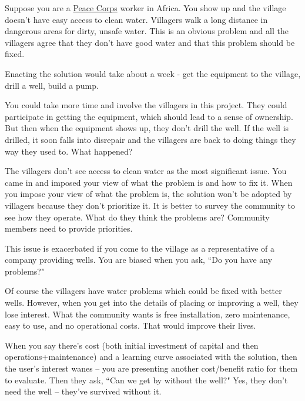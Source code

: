\begin{mdframed}[frametitle={Building a Well in a Village},frametitlerule=true,frametitlealignment=\centering]
Suppose you are a \href{http://www.peacecorps.gov/}{Peace Corps} worker in Africa. 
You show up and the village doesn't have easy access to clean water. Villagers walk a long distance in dangerous areas for dirty, unsafe water. This is an obvious problem and all the villagers agree that they don't have good water and that this problem should be fixed.

Enacting the solution would take about a week - get the equipment to the village, drill a well, build a pump.

You could take more time and involve the villagers in this project. They could participate in getting the equipment, which should lead to a sense of ownership.
But then when the equipment shows up, they don't drill the well. If the well is drilled, it soon falls into disrepair and the villagers are back to doing things they way they used to. What happened?

The villagers don't see access to clean water as the most significant issue. You came in and imposed your view of what the problem is and how to fix it. When you impose your view of what the problem is, the solution won't be adopted by villagers because they don't prioritize it.
It is better to survey the community to see how they operate. What do they think the problems are?
Community members need to provide priorities.

This issue is exacerbated if you come to the village as a representative of a company providing wells. You are biased when you ask, ``Do you have any problems?"

Of course the villagers have water problems which could be fixed with better wells. However, when you get into the details of placing or improving a well, they lose interest. What the community wants is free installation, zero maintenance, easy to use, and no operational costs. That would improve their lives.
\end{mdframed}

When you say there's cost (both initial investment of capital and then operations+maintenance) and a learning curve associated with the solution, then the user's interest wanes -- you are presenting another cost/benefit ratio for them to evaluate. Then they ask, ``Can we get by without the well?" Yes, they don't need the well -- they've survived without it.

